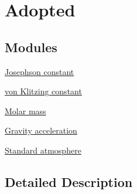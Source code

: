 \hypertarget{group___adopted}{}\section{Adopted}
\label{group___adopted}
\subsection*{Modules}
\begin{DoxyCompactItemize}
\item 
\hyperlink{group___conventional_josephson_constant}{Josephson constant}
\item 
\hyperlink{group___conventionalvon_klitzing_constant}{von Klitzing constant}
\item 
\hyperlink{group___molar_mass}{Molar mass}
\item 
\hyperlink{group___gravity_acceleration}{Gravity acceleration}
\item 
\hyperlink{group___standard_atmosphere}{Standard atmosphere}
\end{DoxyCompactItemize}


\subsection{Detailed Description}
